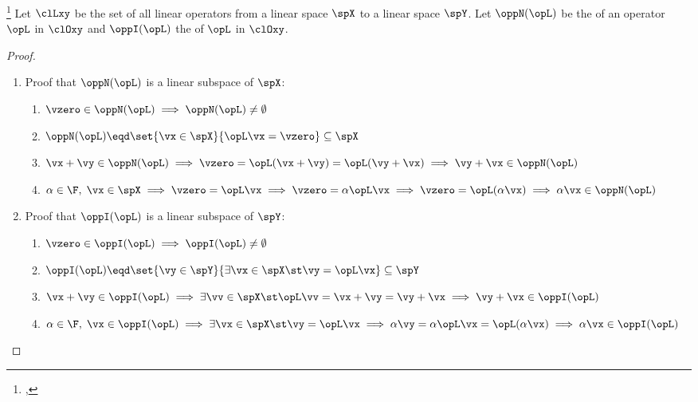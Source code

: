 \begin{theorem}
\footnote{
  ,
  }
Let $\clLxy$ be the set of all linear operators from a linear space $\spX$ to a linear space $\spY$.
Let $\oppN(\opL)$ be the  of an operator $\opL$ in $\clOxy$
and $\oppI(\opL)$ the  of $\opL$ in $\clOxy$.
\end{theorem}
\begin{proof}
\begin{enumerate}
  \item Proof that $\oppN(\opL)$ is a linear subspace of $\spX$:
    \begin{enumerate}
      \item $\vzero\in\oppN(\opL) \implies \oppN(\opL)\ne \emptyset$
      \item $\oppN(\opL)\eqd\set{\vx\in\spX}{\opL\vx=\vzero}\subseteq\spX$
      \item $\vx+\vy\in\oppN(\opL) \implies \vzero=\opL(\vx+\vy)=\opL(\vy+\vx)\implies \vy+\vx\in\oppN(\opL)$
      \item $\alpha\in\F,\; \vx\in\spX
            \implies \vzero=\opL\vx
            \implies \vzero=\alpha\opL\vx
            \implies \vzero=\opL(\alpha\vx)
            \implies \alpha\vx \in \oppN(\opL)$
    \end{enumerate}

  \item Proof that $\oppI(\opL)$ is a linear subspace of $\spY$:
    \begin{enumerate}
      \item $\vzero\in\oppI(\opL) \implies \oppI(\opL)\ne \emptyset$
      \item $\oppI(\opL)\eqd\set{\vy\in\spY}{\exists\vx\in\spX\st\vy=\opL\vx}\subseteq\spY$
      \item $\vx+\vy\in\oppI(\opL) \implies \exists\vv\in\spX\st\opL\vv=\vx+\vy=\vy+\vx \implies \vy+\vx\in\oppI(\opL)$
      \item $\alpha\in\F,\; \vx\in\oppI(\opL)
            \implies \exists\vx\in\spX \st \vy=\opL\vx
            \implies \alpha\vy=\alpha\opL\vx=\opL(\alpha\vx)
            \implies \alpha\vx \in \oppI(\opL)$
    \end{enumerate}
\end{enumerate}
\end{proof}


